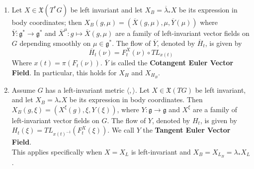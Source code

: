 \begin{prop}

\begin{enumerate}
    \item Let $X \in \mathfrak{X}(T^*G)$ be left invariant and let $X_B = \overline{\lambda}_* X$ be its expression in body coordinates; then $X_B (g,\mu) = (\overline{X}(g,\mu), \mu, \overline{Y}(\mu))$ where $\overline{Y}: \mathfrak{g}^* \to \mathfrak{g}^*$ and $\overline{X}^{\mu}: g \mapsto \overline{X}(g,\mu)$ are a family of left-invariant vector fields on $G$ depending smoothly on $\mu \in \mathfrak{g}^*$. The flow of $\overline{Y}$, denoted by $\overline{H}_t$, is given by \begin{equation} \overline{H}_t(\nu) = F^X_t(\nu) \circ TL_{x(t)} \end{equation}
    Where $x(t) = \pi(F_t(\nu))$. $\overline{Y}$ is called the \textbf{Cotangent Euler Vector Field}. In particular, this holds for $X_H$ and $X_{H_B}$.
    
    \item Assume $G$ has a left-invariant metric $\langle , \rangle$. Let $X \in \mathfrak{X}(TG)$ be left invariant, and let $X_B=\lambda_* X$ be its expression in body coordinates. Then $X_B(g,\xi) = (X^{\xi}(g), \xi, Y(\xi))$, where $Y:\mathfrak{g} \to \mathfrak{g}$ and $X^{\xi}$ are a family of left-invariant vector fields on $G$. The flow of $Y$, denoted by $H_t$, is given by $H_t(\xi) = TL_{x(t)^{-1}}(F^X_t(\xi))$. We call $Y$ the \textbf{Tangent Euler Vector Field}.\\
    \indent This applies specifically when $X=X_L$ is left-invariant and $X_B = X_{L_B} = \lambda_* X_L$.
    \end{enumerate}
\end{prop}

